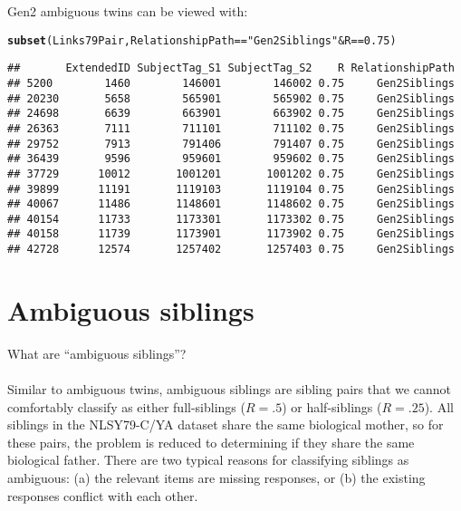\documentclass{article}\usepackage[]{graphicx}\usepackage[]{color}
\makeatletter
\newcommand{\hlnum}[1]{\textcolor[rgb]{0.686,0.059,0.569}{#1}}%
\newcommand{\hlstr}[1]{\textcolor[rgb]{0.192,0.494,0.8}{#1}}%
\newcommand{\hlopt}[1]{\textcolor[rgb]{0,0,0}{#1}}%
\newcommand{\hlstd}[1]{\textcolor[rgb]{0.345,0.345,0.345}{#1}}%
\newcommand{\hlkwd}[1]{\textcolor[rgb]{0.737,0.353,0.396}{\textbf{#1}}}%
\newenvironment{kframe}{%
 \def\at@end@of@kframe{}%
 \ifinner\ifhmode%
  \def\at@end@of@kframe{\end{minipage}}%
  \begin{minipage}{\columnwidth}%
 \fi\fi%
 \def\FrameCommand##1{\hskip\@totalleftmargin \hskip-\fboxsep
 \colorbox{shadecolor}{##1}\hskip-\fboxsep
     \hskip-\linewidth \hskip-\@totalleftmargin \hskip\columnwidth}%
 \MakeFramed {\advance\hsize-\width
   \@totalleftmargin\z@ \linewidth\hsize
   \@setminipage}}%
 {\par\unskip\endMakeFramed%
 \at@end@of@kframe}
\newenvironment{knitrout}{}{} %
\makeatother
\begin{document}
Gen2 ambiguous twins can be viewed with:
\begin{knitrout}
\color{fgcolor}\begin{kframe}
\begin{alltt}
\hlkwd{subset}\hlstd{(Links79Pair, RelationshipPath} \hlopt{==} \hlstr{"Gen2Siblings"} \hlopt{&} \hlstd{R} \hlopt{==} \hlnum{0.75}\hlstd{)}
\end{alltt}
\begin{verbatim}
##       ExtendedID SubjectTag_S1 SubjectTag_S2    R RelationshipPath
## 5200        1460        146001        146002 0.75     Gen2Siblings
## 20230       5658        565901        565902 0.75     Gen2Siblings
## 24698       6639        663901        663902 0.75     Gen2Siblings
## 26363       7111        711101        711102 0.75     Gen2Siblings
## 29752       7913        791406        791407 0.75     Gen2Siblings
## 36439       9596        959601        959602 0.75     Gen2Siblings
## 37729      10012       1001201       1001202 0.75     Gen2Siblings
## 39899      11191       1119103       1119104 0.75     Gen2Siblings
## 40067      11486       1148601       1148602 0.75     Gen2Siblings
## 40154      11733       1173301       1173302 0.75     Gen2Siblings
## 40158      11739       1173901       1173902 0.75     Gen2Siblings
## 42728      12574       1257402       1257403 0.75     Gen2Siblings
\end{verbatim}
\end{kframe}
\end{knitrout}

% 

\section{Ambiguous siblings}
\textsf{What are ``ambiguous siblings''?}\\ \\
Similar to ambiguous twins, ambiguous siblings are sibling pairs that we cannot comfortably classify as either full-siblings ($R=.5$) or half-siblings ($R=.25$).  All siblings in the NLSY79-C/YA dataset share the same biological mother, so for these pairs, the problem is reduced to determining if they share the same biological father.  There are two typical reasons for classifying siblings as ambiguous: (a) the relevant items are missing responses, or (b) the existing responses conflict with each other.  
\end{document}
